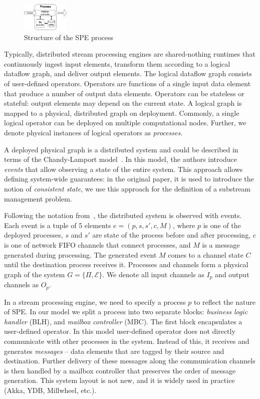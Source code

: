 \begin{figure}[t]
  \centering
  \includegraphics[width=0.2\textwidth]{pics/process-scheme.pdf}
  \caption{Structure of the SPE process}
  \label{fig:spe_process}
\end{figure}

Typically, distributed stream processing engines are shared-nothing runtimes that continuously ingest input elements, transform them according to a logical dataflow graph, and deliver output elements. The logical dataflow graph consists of user-defined operators. Operators are functions of a single input data element that produce a number of output data elements. Operators can be stateless or stateful: output elements may depend on the current state. A logical graph is mapped to a physical, distributed graph on deployment. Commonly, a single logical operator can be deployed on multiple computational nodes. Further, we denote physical instances of logical operators as {\em processes}.

A deployed physical graph is a distributed system and could be described in terms of the Chandy-Lamport model~\cite{Chandy:1985:DSD:214451.214456, carbone2018scalable}. In this model, the authors introduce \textit{events} that allow observing a state of the entire system. This approach allows defining system-wide guarantees: in the original paper, it is used to introduce the notion of {\em consistent state}, we use this approach for the definition of a substream management problem.

Following the notation from~\cite{Chandy:1985:DSD:214451.214456, carbone2018scalable}, the distributed system is observed with events. Each event is a tuple of 5 elements $e = (p, s, s', c, M)$, where $p$ is one of the deployed processes, $s$ and $s'$ are state of the process before and after processing, $c$ is one of network FIFO channels that connect processes, and $M$ is a message generated during processing. The generated event $M$ comes to a channel state $C$ until the destination process receives it. Processes and channels form a physical graph of the system $G=\{\Pi,\mathcal{E}\}$. We denote all input channels as $I_p$ and output channels as $O_p$.

In a stream processing engine, we need to specify a process $p$ to reflect the nature of SPE. In our model we split a process into two separate blocks: {\em business logic handler} (BLH), and {\em mailbox controller} (MBC). The first block encapsulates a user-defined operator. In this model user-defined operator does not directly communicate with other processes in the system. Instead of this, it receives and generates {\em messages} -- data elements that are tagged by their source and destination. Further delivery of these messages along the communication channels is then handled by a mailbox controller that preserves the order of message generation. This system layout is not new, and it is widely used in practice (Akka, YDB, Millwheel, etc.).


